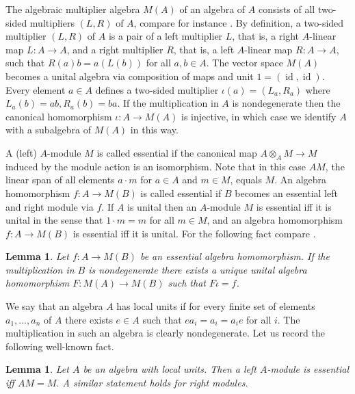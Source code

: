 \documentclass{amsart}
\newtheorem{lemma}[thm]{Lemma}
\DeclareMathOperator{\id}{id}
\begin{document}
The algebraic multiplier algebra $ M(A) $ of an algebra of $ A $ consists of all two-sided multipliers $ (L,R) $ of $ A $, compare for instance \cite[Appendix]{VANDAELE_multiplierhopfalgebras}. By definition, a two-sided multiplier $ (L,R) $ of $ A $ is a pair of a left multiplier $ L $, that is, a right $ A $-linear map $ L: A \rightarrow A $, and a right multiplier $ R $, that is, a left $ A $-linear map $ R: A \rightarrow A $, such that $ R(a)b = a(L(b)) $ for all $ a,b \in A $. The vector space $ M(A) $ becomes a unital algebra via composition of maps and unit $ 1 = (\id, \id) $. Every element $ a \in A $ defines a two-sided multiplier $ \iota(a) = (L_a, R_a) $ where $ L_a(b) = ab, R_a(b) = ba $. If the multiplication in $ A $ is nondegenerate then the canonical homomorphism $ \iota: A \rightarrow M(A) $ is injective, in which case we identify $ A $ with a subalgebra of $ M(A) $ in this way. 

A (left) $ A $-module $ M $ is called essential if the canonical map $ A \otimes_A M \rightarrow M $ induced by the module action is an isomorphism. Note that in this case $ AM $, the linear span of all elements $ a \cdot m $ for $ a \in A $ and $ m \in M $, equals $ M $. 
An algebra homomorphism $ f: A \rightarrow M(B) $ is called essential if $ B $ becomes an essential left and right module via $ f $. 
If $ A $ is unital then an $ A $-module $ M $ is essential iff it is unital in the sense that $ 1 \cdot m = m $ for all $ m \in M $, 
and an algebra homomorphism $ f: A \rightarrow M(B) $ is essential iff it is unital. For the following fact compare \cite[Proposition A.5]{VANDAELE_multiplierhopfalgebras}. 

\begin{lemma} 
Let $ f: A \rightarrow M(B) $ be an essential algebra homomorphism. If the multiplication in $ B $ is nondegenerate there exists a unique unital algebra homo\-morphism $ F: M(A) \rightarrow M(B) $ such that $ F \iota = f $. 
\end{lemma}

We say that an algebra $ A $ has local units if for every finite set of elements $ a_1, \dots, a_n $ of $ A $ there exists $ e \in A $ such that $ e a_i = a_i = a_i e $ for all $ i $. The multiplication in such an algebra is clearly nondegenerate. Let us record the following well-known fact. 

\begin{lemma} \label{localunitsessential}
Let $ A $ be an algebra with local units. Then a left $ A $-module is essential iff $ AM = M $. A similar statement holds for right modules. 
\end{lemma}
\end{document}
